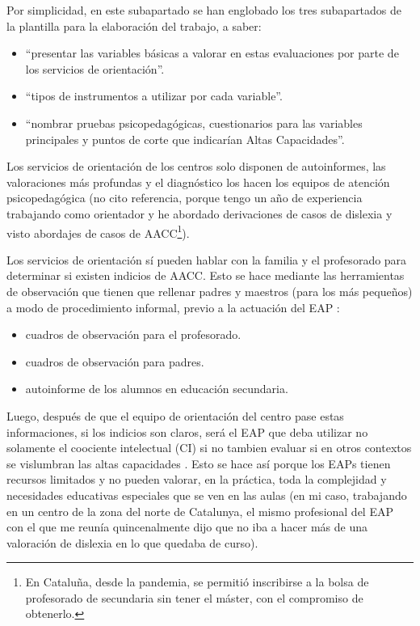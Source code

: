 \documentclass[12pt, a4paper]{article}
\begin{document}
			\begin{tcolorbox}[
				colback=gray!10,
				colframe=gray!50,
				boxrule=0.5pt,
				arc=2mm
			]
			Por simplicidad, en este subapartado se han englobado los tres subapartados de la plantilla para la elaboración del trabajo, a saber:
			
			\begin{itemize}
				\item ``presentar las variables básicas a valorar en estas evaluaciones por parte de los servicios de orientación''.
				\item ``tipos de instrumentos a utilizar por cada variable''. 
				\item ``nombrar pruebas psicopedagógicas, cuestionarios para las variables principales y puntos de corte que indicarían Altas Capacidades''.
			\end{itemize}

		\end{tcolorbox}

	 	
	 	
	 	
	 Los servicios de orientación de los centros solo disponen de autoinformes, las valoraciones más profundas y el diagnóstico los hacen los equipos de atención psicopedagógica (no cito referencia, porque tengo un año de experiencia trabajando como orientador y he abordado derivaciones de casos de dislexia y visto abordajes de casos de AACC\footnote{En Cataluña, desde la pandemia, se permitió inscribirse a la bolsa de profesorado de secundaria sin tener el máster, con el compromiso de obtenerlo.}). 
	 
	 Los servicios de orientación sí pueden hablar con la familia y el profesorado para determinar si existen indicios de AACC. Esto se hace mediante las herramientas de observación que tienen que rellenar padres y maestros (para los más pequeños) a modo de procedimiento informal, previo a la actuación del EAP 	 \parencite[11]{gencatAltesCapacitats2013}:
	 
	 \begin{itemize}[noitemsep]
	 	\item cuadros de observación para el profesorado.
	 	\item cuadros de observación para padres.
	 	\item  autoinforme de los alumnos en educación secundaria.
	 \end{itemize}
	 

	 
	  Luego, después de que el equipo de orientación del centro pase estas informaciones, si los indicios son claros, será el EAP que deba utilizar no solamente el coociente intelectual (CI) si no tambien evaluar si en otros contextos se vislumbran las altas capacidades
	  \parencite[p.~10, párr.~3]{gencatAltesCapacitats2013}. Esto se hace así porque los EAPs tienen recursos limitados y no pueden valorar, en la práctica, toda la complejidad y necesidades educativas especiales que se ven en las aulas (en mi caso, trabajando en un centro de la zona del norte de Catalunya, el mismo profesional del EAP con el que me reunía quincenalmente dijo que no iba a hacer más de una valoración de dislexia en lo que quedaba de curso).
	  
\end{document}
